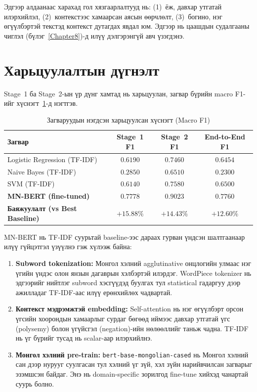 Эдгээр алдаанаас харахад гол хязгаарлалтууд нь: (1)~ёж, давхар утгатай
илэрхийлэл, (2)~контекстээс хамаарсан аясын өөрчлөлт, (3)~богино, нэг өгүүлбэртэй
текстэд контекст дутагдах явдал юм. Эдгээр нь цаашдын судалгааны чиглэл
(бүлэг~\ref{Chapter8})-д илүү дэлгэрэнгүй авч үзэгдэнэ.

\section{Харьцуулалтын дүгнэлт}
\label{sec:comparison}

Stage~1 ба Stage~2-ын үр дүнг хамтад нь харьцуулан, загвар бүрийн macro F1-ийг
хүснэгт~\ref{tab:comparison-summary}-д нэгтгэв.

\begin{table}[H]
\centering
\caption{Загваруудын нэгдсэн харьцуулсан хүснэгт (Macro F1)}
\label{tab:comparison-summary}
\begin{tabular}{@{}lccc@{}}
\toprule
\textbf{Загвар} & \textbf{Stage~1 F1} & \textbf{Stage~2 F1} & \textbf{End-to-End F1} \\
\midrule
Logistic Regression (TF-IDF)         & $0.6190$ & $0.7460$ & $0.6454$ \\
Naive Bayes (TF-IDF)                & $0.2850$ & $0.6510$ & $0.2300$ \\
SVM (TF-IDF)                        & $0.6140$ & $0.7580$ & $0.6500$ \\
\textbf{MN-BERT (fine-tuned)}        & $\mathbf{0.7778}$ & $\mathbf{0.9023}$ & $\mathbf{0.7760}$ \\
\midrule
\textbf{Баяжуулалт (vs Best Baseline)} & $+15.88\%$ & $+14.43\%$ & $+12.60\%$ \\
\bottomrule
\end{tabular}
\end{table}

MN-BERT нь TF-IDF суурьтай baseline-ээс дараах гурван үндсэн шалтгаанаар илүү
гүйцэтгэл үзүүлнэ гэж хүлээж байна:

\begin{enumerate}
  \item \textbf{Subword tokenization:} Монгол хэлний agglutinative онцлогийн
    улмаас нэг үгийн үндэс олон янзын дагаврын хэлбэртэй илэрдэг. WordPiece
    tokenizer нь эдгээрийг нийтлэг subword хэсгүүдэд буулгах тул statistical
    гадаргуу дээр ажилладаг TF-IDF-аас илүү ерөнхийлөх чадвартай.
  \item \textbf{Контекст мэдрэмжтэй embedding:} Self-attention нь нэг өгүүлбэрт
    орсон үгсийн хоорондын хамаарлыг сурдаг бөгөөд иймээс давхар утгатай
    үгс (polysemy) болон үгүйсгэл (negation)-ийн нөлөөллийг таньж чадна.
    TF-IDF нь үг бүрийг тусад нь scalar-аар илэрхийлнэ.
  \item \textbf{Монгол хэлний pre-train:} \texttt{bert-base-mongolian-cased}
    нь Монгол хэлний сан дээр нурууг суулгасан тул хэлний үг зүй, хэл зүйн
    нарийвчилсан загварыг эзэмшсэн байдаг. Энэ нь domain-specific зорилгод
    fine-tune хийхэд чанартай суурь болно.
\end{enumerate}

